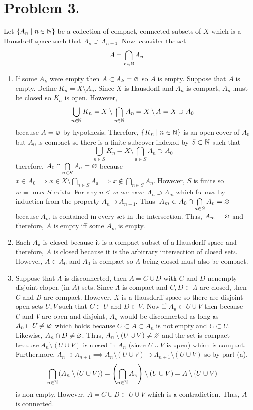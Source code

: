 \documentclass[12pt]{extarticle}
\begin{document}
\section*{Problem 3.}
Let $\{A_n \mid n \in \mathbb{N}\}$ be a collection of compact, connected subsets of $X$ which is a Hausdorff space such that $A_n \supset A_{n+1}$. Now, consider the set \[A = \bigcap_{n \in \mathbb{N}} A_n\]
\begin{enumerate}
\item If some $A_k$ were empty then $A \subset A_k = \varnothing$ so $A$ is empty. Suppose that $A$ is empty. Define $K_n = X \setminus A_n$. Since $X$ is Hausdorff and $A_n$ is compact, $A_n$ must be closed so $K_n$ is open. However, \[\bigcup_{n \in \mathbb{N}} K_n = X \setminus \bigcap_{n \in \mathbb{N}} A_n = X \setminus A = X \supset A_0\]
because $A = \varnothing$ by hypothesis. Therefore, $\{K_n \mid n \in \mathbb{N} \}$ is an open cover of $A_0$ but $A_0$ is compact so there is a finite subcover indexed by $S \subset \mathbb{N}$ such that \[\bigcup_{n \in S} K_n = X \setminus \bigcap_{n \in S} A_n \supset A_0\] 
therefore, $A_0 \cap \bigcap\limits_{n \in S} A_n = \varnothing$ because $x \in A_0 \implies x \in X \setminus \bigcap\limits_{n \in S} A_n \implies x \notin \bigcap\limits_{n \in S} A_n$. However, $S$ is finite so $m = \max{S}$ exists. For any $n \le m$ we have $A_n \supset A_m$ which follows by induction from the property $A_{n} \supset A_{n+1}$. Thus, $A_m \subset A_0 \cap \bigcap\limits_{n \in S} A_n = \varnothing$ because $A_m$ is contained in every set in the intersection. Thus, $A_m = \varnothing$ and therefore, $A$ is empty iff some $A_m$ is empty.  

\item Each $A_n$ is closed because it is a compact subset of a Hausdorff space and therefore, $A$ is closed because it is the arbitrary intersection of closed sets. However, $A \subset A_0$ and $A_0$ is compact so $A$ being closed must also be compact. 

\item Suppose that $A$ is disconnected, then $A = C \cup D$ with $C$ and $D$ nonempty disjoint clopen (in $A$) sets. Since $A$ is compact and $C, D \subset A$ are closed, then $C$ and $D$ are compact. However, $X$ is a Hausdorff space so there are disjoint open sets $U, V$ such that $C \subset U$ and $D \subset V$. Now if $A_n \subset U \cup V$ then because $U$ and $V$ are open and disjoint, $A_n$ would be disconnected as long as $A_n \cap U \neq \varnothing$ which holds because $C \subset A \subset A_n$ is not empty and $C \subset U$. Likewise, $A_n \cap D \neq \varnothing$. Thus, $A_n \setminus (U \cup V) \neq \varnothing$ and the set is compact because $A_n \setminus (U \cup V)$ is closed in $A_n$ (since $U \cup V$ is open) which is compact. Furthermore, $A_{n} \supset A_{n+1} \implies A_n \setminus (U \cup V) \supset A_{n+1} \setminus (U \cup V)$ so by part (a), \[ \bigcap_{n \in \mathbb{N}} \left(A_n \setminus (U \cup V) \right) = \left( \bigcap_{n \in \mathbb{N}} A_n \right) \setminus (U \cup V) = A \setminus (U \cup V)\]
is non empty. However, $A = C \cup D \subset U \cup V$ which is a contradiction. Thus, $A$ is connected.
\end{enumerate}
\end{document}
